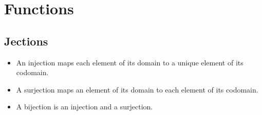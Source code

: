 \section{Functions}


\subsection{Jections}


\begin{itemize}
\item An injection maps each element of its domain to a unique element of
      its codomain.
\item A surjection maps an element of its domain to each element of its
      codomain.
\item A bijection is an injection and a surjection.
\end{itemize}
